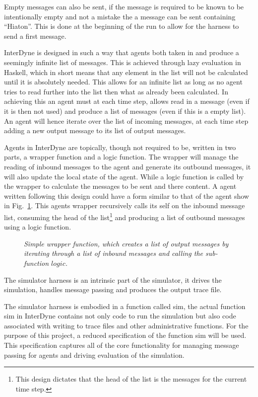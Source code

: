 \documentclass{article}
\begin{document}
Empty messages can also be sent, if the message is required to be known to be intentionally empty and not a mistake the a message can be sent containing ``Hiaton''. This is done at the beginning of the run to allow for the harness to send a first message. 

InterDyne is designed in such a way that agents both taken in and produce a seemingly infinite list of messages. This is achieved through lazy evaluation in Haskell, which in short means that any element in the list will not be calculated until it is absolutely needed. This allows for an infinite list as long as no agent tries to read further into the list then what as already been calculated. In achieving this an agent must at each time step, allows read in a message (even if it is then not used) and produce a list of messages (even if this is a empty list). An agent will hence iterate over the list of incoming messages, at each time step adding a new output message to its list of output messages.  

Agents in InterDyne are topically, though not required to be, written in two parts, a wrapper function and a logic function. The wrapper will manage the reading of inbound messages to the agent and generate its outbound messages, it will also update the local state of the agent. While a logic function is called by the wrapper to calculate the messages to be sent and there content. A agent written following this design could have a form similar to that of the agent show in Fig.~\ref{fig:wrapperfrominterdyne}. This agents wrapper recursively calls its self on the inbound message list, consuming the head of the list\footnote{This design dictates that the head of the list is the messages for the current time step.} and producing a list of outbound messages using a logic function.  
\begin{figure}[H]
	\centering
        
	\caption{\it Simple wrapper function, which creates a list of output messages by iterating through a list of inbound messages and calling the sub-function $logic$.}
	\label{fig:wrapperfrominterdyne}
\end{figure} 

The simulator harness is an intrinsic part of the simulator, it drives the simulation, handles message passing and produces the output trace file.

The simulator harness is embodied in a function called sim, the actual function sim in InterDyne contains not only code to run the simulation but also code associated with writing to trace files and other administrative functions. For the purpose of this project, a reduced specification of the function sim will be used. This specification captures all of the core functionality for managing message passing for agents and driving evaluation of the simulation.
\end{document}

